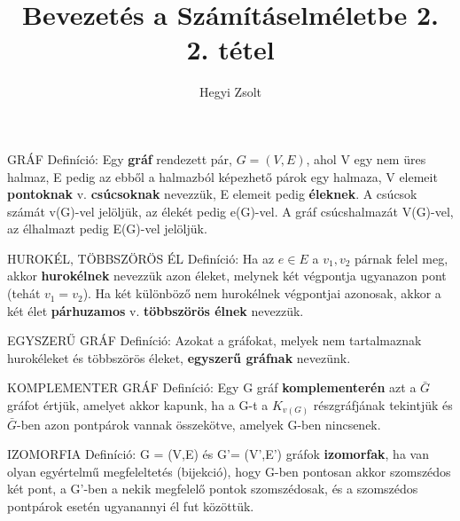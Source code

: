 \documentclass[]{article}
\title{Bevezetés a Számításelméletbe 2.\\{\large 2. tétel}}
\author{Hegyi Zsolt}
\begin{document}
\maketitle{}
\begin{shaded}
GRÁF Definíció: Egy \textbf{gráf} rendezett pár, $G = (V,E)$, ahol V egy nem üres halmaz, E pedig az ebből a halmazból képezhető párok egy halmaza, V elemeit \textbf{pontoknak} v. \textbf{csúcsoknak} nevezzük, E elemeit pedig \textbf{éleknek}. A csúcsok számát v(G)-vel jelöljük, az élekét pedig e(G)-vel. A gráf csúcshalmazát V(G)-vel, az élhalmazt pedig E(G)-vel jelöljük.
\end{shaded}
\begin{shaded}
HUROKÉL, TÖBBSZÖRÖS ÉL Definíció: Ha az $e \in E$ a {$v_1, v_2$} párnak felel meg, akkor \textbf{hurokélnek} nevezzük azon éleket, melynek két végpontja ugyanazon pont (tehát $v_1 = v_2$). Ha két különböző nem hurokélnek végpontjai azonosak, akkor a két élet \textbf{párhuzamos} v. \textbf{többszörös élnek} nevezzük.
\end{shaded}
\begin{shaded}
EGYSZERŰ GRÁF Definíció: Azokat a gráfokat, melyek nem tartalmaznak hurokéleket és többszörös éleket, \textbf{egyszerű gráfnak} nevezünk.
\end{shaded}
\begin{shaded}
KOMPLEMENTER GRÁF Definíció: Egy G gráf \textbf{komplementerén} azt a $\bar{G}$ gráfot értjük, amelyet akkor kapunk, ha a G-t a $K_{v(G)}$ részgráfjának tekintjük és $\bar{G}$-ben azon pontpárok vannak összekötve, amelyek G-ben nincsenek.
\end{shaded}
\begin{shaded}
IZOMORFIA Definíció: G = (V,E) és G'= (V',E') gráfok \textbf{izomorfak}, ha van olyan egyértelmű megfeleltetés (bijekció), hogy G-ben pontosan akkor szomszédos két pont, a G'-ben a nekik megfelelő pontok szomszédosak, és a szomszédos pontpárok esetén ugyanannyi él fut közöttük.
\end{shaded}
\end{document}
